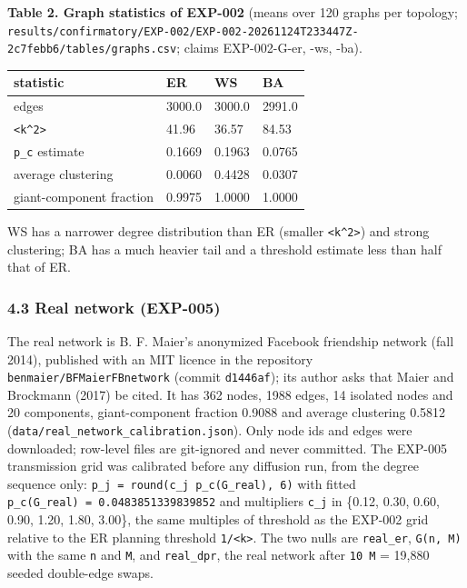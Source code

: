 \documentclass[
]{article}
\begin{document}
\textbf{Table 2. Graph statistics of EXP-002} (means over 120 graphs per
topology;
\texttt{results/confirmatory/EXP-002/EXP-002-20261124T233447Z-2c7febb6/tables/graphs.csv};
claims EXP-002-G-er, -ws, -ba).

\begin{longtable}[]{@{}llll@{}}
\toprule\noalign{}
statistic & ER & WS & BA \\
\midrule\noalign{}
\endhead
\bottomrule\noalign{}
\endlastfoot
edges & 3000.0 & 3000.0 & 2991.0 \\
\texttt{\textless{}k\^{}2\textgreater{}} & 41.96 & 36.57 & 84.53 \\
\texttt{p\_c} estimate & 0.1669 & 0.1963 & 0.0765 \\
average clustering & 0.0060 & 0.4428 & 0.0307 \\
giant-component fraction & 0.9975 & 1.0000 & 1.0000 \\
\end{longtable}

WS has a narrower degree distribution than ER (smaller
\texttt{\textless{}k\^{}2\textgreater{}}) and strong clustering; BA has
a much heavier tail and a threshold estimate less than half that of ER.

\subsubsection{4.3 Real network (EXP-005)}\label{real-network-exp-005}

The real network is B. F. Maier's anonymized Facebook friendship network
(fall 2014), published with an MIT licence in the repository
\texttt{benmaier/BFMaierFBnetwork} (commit \texttt{d1446af}); its author
asks that Maier and Brockmann (2017) be cited. It has 362 nodes, 1988
edges, 14 isolated nodes and 20 components, giant-component fraction
0.9088 and average clustering 0.5812
(\texttt{data/real\_network\_calibration.json}). Only node ids and edges
were downloaded; row-level files are git-ignored and never committed.
The EXP-005 transmission grid was calibrated before any diffusion run,
from the degree sequence only:
\texttt{p\_j\ =\ round(c\_j\ p\_c(G\_real),\ 6)} with fitted
\texttt{p\_c(G\_real)\ =\ 0.0483851339839852} and multipliers
\texttt{c\_j} in \{0.12, 0.30, 0.60, 0.90, 1.20, 1.80, 3.00\}, the same
multiples of threshold as the EXP-002 grid relative to the ER planning
threshold \texttt{1/\textless{}k\textgreater{}}. The two nulls are
\texttt{real\_er}, \texttt{G(n,\ M)} with the same \texttt{n} and
\texttt{M}, and \texttt{real\_dpr}, the real network after
\texttt{10\ M} = 19,880 seeded double-edge swaps.
\end{document}
